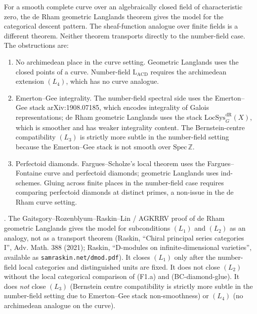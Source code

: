 For a smooth complete curve over an algebraically closed field of
characteristic zero, the de Rham geometric Langlands theorem gives the
model for the categorical descent pattern.  The sheaf-function
analogue over finite fields is a different theorem.  Neither theorem
transports directly to the number-field case.  The obstructions are:
\begin{enumerate}
\item No archimedean place in the curve setting. Geometric Langlands
uses the closed points of a curve. Number-field \(\mathrm{L}_{\mathrm{ACD}}\)
requires the archimedean extension \((L_{4})\), which has no curve
analogue.
\item Emerton--Gee integrality. The number-field spectral side uses
the Emerton--Gee stack arXiv:1908.07185, which encodes integrality
of Galois representations; de Rham geometric Langlands uses the stack
\(\mathrm{LocSys}^{\mathrm{dR}}_{G}(X)\), which is smoother and has
weaker integrality content. The Bernstein-centre compatibility
\((L_{3})\) is strictly more subtle in the number-field setting
because the Emerton--Gee stack is not smooth over
\(\mathrm{Spec}\,\mathbb{Z}\).
\item Perfectoid diamonds. Fargues--Scholze's local theorem uses the
Fargues--Fontaine curve and perfectoid diamonds; geometric Langlands
uses ind-schemes. Gluing across finite places in the
number-field case requires comparing perfectoid diamonds at
distinct primes, a non-issue in the de Rham curve setting.
\end{enumerate}

\begin{theorem}
\label{v4-arith:acd:thm:function-field-transport}
\ClaimStatusNeedsVerification. The Gaitsgory--Rozenblyum--Raskin--Lin /
AGKRRV proof of de Rham geometric Langlands gives the model for
subconditions \((L_{1})\) and \((L_{2})\) as an analogy, not as a
transport theorem (Raskin,
``Chiral principal series categories I'', Adv. Math. 388 (2021);
Raskin, ``D-modules on infinite-dimensional varieties'', available
as \texttt{samraskin.net/dmod.pdf}). It closes \((L_{1})\) only after
the number-field local categories and distinguished units are fixed.
It does not close \((L_{2})\) without the local categorical comparison
of (F1.a) and (BC-diamond-glue).
It does \emph{not} close \((L_{3})\) (Bernstein centre compatibility
is strictly more subtle in the number-field setting due to
Emerton--Gee stack non-smoothness) or \((L_{4})\) (no archimedean
analogue on the curve).
\end{theorem}


